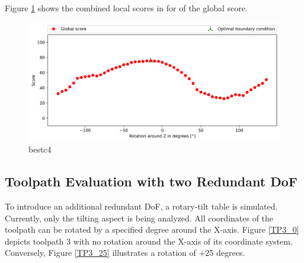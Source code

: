 Figure \ref{GS4} shows the combined local scores in for of the global score. 

\begin{figure}[H]
	\centerline{\includegraphics[width=1\textwidth]{figures/best_c_4.png}}
	\caption{bestc4}
	\label{GS4}
\end{figure}


\newpage
\subsection{Toolpath Evaluation with two Redundant DoF}\label{2RDOF}

To introduce an additional redundant \acrshort{DoF}, a rotary-tilt table is simulated. Currently, only the tilting aspect is being analyzed. All coordinates of the toolpath can be rotated by a specified degree around the X-axis. Figure \ref{TP3_0} depicts toolpath 3 with no rotation around the X-axis of its coordinate system. Conversely, Figure \ref{TP3_25} illustrates a rotation of +25 degrees.

